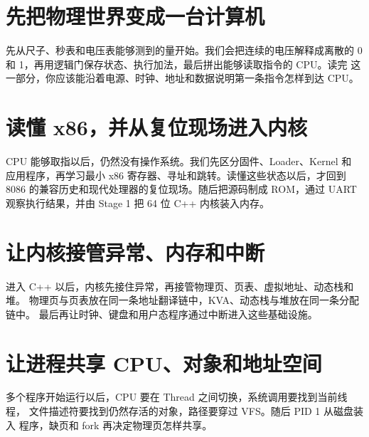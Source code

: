 \documentclass[UTF8,openany,zihao=5,fontset=none]{ctexbook}
\begin{document}
\frontmatter



\tableofcontents

\mainmatter
\part{先把物理世界变成一台计算机}
\begin{partbridge}
先从尺子、秒表和电压表能够测到的量开始。我们会把连续的电压解释成离散的
0 和 1，再用逻辑门保存状态、执行加法，最后拼出能够读取指令的 CPU。读完
这一部分，你应该能沿着电源、时钟、地址和数据说明第一条指令怎样到达 CPU。
\end{partbridge}




\part{读懂 x86，并从复位现场进入内核}
\begin{partbridge}
CPU 能够取指以后，仍然没有操作系统。我们先区分固件、Loader、Kernel 和
应用程序，再学习最小 x86 寄存器、寻址和跳转。读懂这些状态以后，才回到
8086 的兼容历史和现代处理器的复位现场。随后把源码制成 ROM，通过 UART
观察执行结果，并由 Stage 1 把 64 位 C++ 内核装入内存。
\end{partbridge}






\part{让内核接管异常、内存和中断}
\begin{partbridge}
进入 C++ 以后，内核先接住异常，再接管物理页、页表、虚拟地址、动态栈和堆。
物理页与页表放在同一条地址翻译链中，KVA、动态栈与堆放在同一条分配链中。
最后再让时钟、键盘和用户态程序通过中断进入这些基础设施。
\end{partbridge}





\part{让进程共享 CPU、对象和地址空间}
\begin{partbridge}
多个程序开始运行以后，CPU 要在 Thread 之间切换，系统调用要找到当前线程，
文件描述符要找到仍然存活的对象，路径要穿过 VFS。随后 PID 1 从磁盘装入
程序，缺页和 fork 再决定物理页怎样共享。
\end{partbridge}



\end{document}
